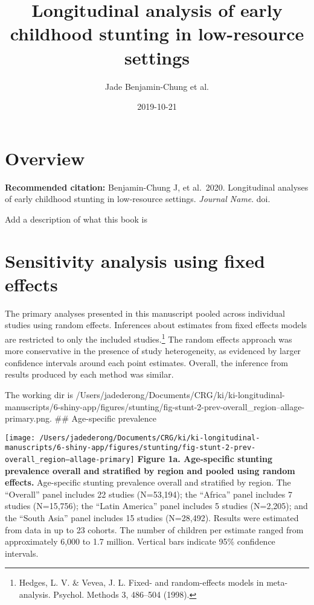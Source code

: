 \documentclass[9pt,]{book}
\title{Longitudinal analysis of early childhood stunting in low-resource settings}
\author{Jade Benjamin-Chung et al.}
\date{2019-10-21}
\let\rmarkdownfootnote\footnote%
\def\footnote{\protect\rmarkdownfootnote}
\begin{document}
\maketitle

{
\setcounter{tocdepth}{1}
\tableofcontents
}
\hypertarget{overview}{%
\chapter{Overview}\label{overview}}

\textbf{Recommended citation:} Benjamin-Chung J, et al.~2020. Longitudinal analyses of early childhood stunting in low-resource settings. \emph{Journal Name}. doi.

Add a description of what this book is

\hypertarget{fixed-effects}{%
\chapter{Sensitivity analysis using fixed effects}\label{fixed-effects}}

The primary analyses presented in this manuscript pooled across individual studies using random effects. Inferences about estimates from fixed effects models are restricted to only the included studies.\footnote{Hedges, L. V. \& Vevea, J. L. Fixed- and random-effects models in meta-analysis. Psychol. Methods 3, 486--504 (1998).} The random effects approach was more conservative in the presence of study heterogeneity, as evidenced by larger confidence intervals around each point estimates. Overall, the inference from results produced by each method was similar.

The working dir is /Users/jadederong/Documents/CRG/ki/ki-longitudinal-manuscripts/6-shiny-app/figures/stunting/fig-stunt-2-prev-overall\_region--allage-primary.png.
\#\# Age-specific prevalence

\texttt{[image: /Users/jadederong/Documents/CRG/ki/ki-longitudinal-manuscripts/6-shiny-app/figures/stunting/fig-stunt-2-prev-overall\_region--allage-primary]}
\textbf{Figure 1a. Age-specific stunting prevalence overall and stratified by region and pooled using random effects. } Age-specific stunting prevalence overall and stratified by region. The ``Overall'' panel includes 22 studies (N=53,194); the ``Africa'' panel includes 7 studies (N=15,756); the ``Latin America'' panel includes 5 studies (N=2,205); and the ``South Asia'' panel includes 15 studies (N=28,492). Results were estimated from data in up to 23 cohorts. The number of children per estimate ranged from approximately 6,000 to 1.7 million. Vertical bars indicate 95\% confidence intervals.
\end{document}
